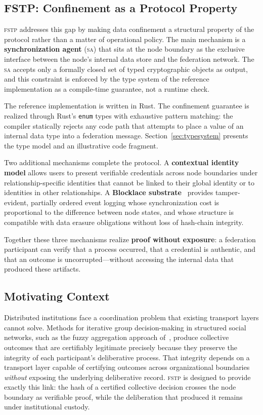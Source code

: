 \documentclass[12pt]{article}
\newcommand{\SA}{\textsc{sa}}
\newcommand{\FSTP}{\textsc{fstp}}
\begin{document}
	\subsection{FSTP: Confinement as a Protocol Property}
	
	\FSTP{} addresses this gap by making data confinement a structural
	property of the protocol rather than a matter of operational policy.
	The main mechanism is a \textbf{synchronization agent} (\SA{}) that
	sits at the node boundary as the exclusive interface between the
	node's internal data store and the federation network. The \SA{}
	accepts only a formally closed set of typed cryptographic objects as
	output, and this constraint is enforced by the type system of the
	reference implementation as a compile-time guarantee, not a runtime
	check.
	
	The reference implementation is written in Rust. The confinement
	guarantee is realized through Rust's \texttt{enum} types with
	exhaustive pattern matching: the compiler statically rejects any code
	path that attempts to place a value of an internal data type into a
	federation message. Section~\ref{sec:typesystem} presents the type
	model and an illustrative code fragment.
	
	Two additional mechanisms complete the protocol. A
	\textbf{contextual identity model} allows users to present verifiable
	credentials across node boundaries under relationship-specific
	identities that cannot be linked to their global identity or to
	identities in other relationships. A \textbf{Blocklace
		substrate}~\cite{shapiro2023grassroots,keidar2023cordial} provides
	tamper-evident, partially ordered event logging whose synchronization
	cost is proportional to the difference between node states, and whose
	structure is compatible with data erasure obligations without loss of
	hash-chain integrity.
	
	Together these three mechanisms realize \textbf{proof without
		exposure}: a federation participant can verify that a process
	occurred, that a credential is authentic, and that an outcome is
	uncorrupted---without accessing the internal data that produced these
	artifacts.
	
	\subsection{Motivating Context}
	\label{sec:motivation}
	
	Distributed institutions face a coordination problem that existing
	transport layers cannot solve. Methods for iterative group decision-making
	in structured social networks, such as the fuzzy aggregation
	approach of~\cite{soto2016mqdm}, produce collective outcomes that are
	certifiably legitimate precisely because they preserve the integrity
	of each participant's deliberative process. That integrity depends on
	a transport layer capable of certifying outcomes across organizational
	boundaries \emph{without} exposing the underlying deliberative record.
	\FSTP{} is designed to provide exactly this link: the hash of a
	certified collective decision crosses the node boundary as verifiable
	proof, while the deliberation that produced it remains under
	institutional custody.
	
\end{document}
